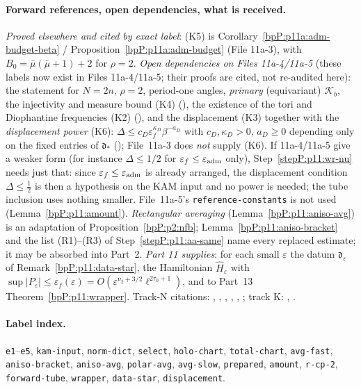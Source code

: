 \paragraph{Forward references, open dependencies, what is received.} \emph{Proved elsewhere and cited by exact label}: (K5) is Corollary~\ref{bpP:p11a:adm-budget-beta} / Proposition~\ref{bpP:p11a:adm-budget} (File 11a-3), with $B_0=\bar\mu(\bar\mu+1)+2$ for $\rho=2$. \emph{Open dependencies on Files 11a-4/11a-5} (these labels now exist in Files 11a-4/11a-5; their proofs are cited, not re-audited here): the statement  for $N=2n$, $\rho=2$, period-one angles, \emph{primary} (equivariant) $\mathcal K_b$, the injectivity and measure bound (K4) (), the existence of the tori and Diophantine frequencies (K2) (), and the displacement (K3) together with the \emph{displacement power} (K6): $\Delta\le c_D\varepsilon_f^{\kappa_D}\beta^{-a_D}$ with $c_D,\kappa_D>0$, $a_D\ge0$ depending only on the fixed entries of $\mathfrak d_*$ (); File~11a-3 does \emph{not} supply (K6). If 11a-4/11a-5 give a weaker form (for instance $\Delta\le1/2$ for $\varepsilon_f\le\varepsilon_{\rm adm}$ only), Step~\ref{stepP:p11:wr-nu} needs just that: since $\varepsilon_f\le\varepsilon_{\rm adm}$ is already arranged, the displacement condition $\Delta\le\frac12$ is then a hypothesis on the KAM input and no power is needed; the tube inclusion uses nothing smaller. File~11a-5's \texttt{reference-constants} is not used (Lemma~\ref{bpP:p11:amount}). \emph{Rectangular averaging} (Lemma~\ref{bpP:p11:aniso-avg}) is an adaptation of Proposition~\ref{bpP:p2:nfb}; Lemma~\ref{bpP:p11:aniso-bracket} and the list (R1)--(R3) of Step~\ref{stepP:p11:aa-same} name every replaced estimate; it may be absorbed into Part~2. \emph{Part 11 supplies}: for each small $\varepsilon$ the datum $\mathfrak d_\varepsilon$ of Remark~\ref{bpP:p11:data-star}, the Hamiltonian $\hat H_\varepsilon$ with $\sup\lvert P_\varepsilon\rvert\le\varepsilon_f(\varepsilon)=O(\varepsilon^{\nu_2+3/2}\ell^{2\tau_0+1})$, and to Part~13 Theorem~\ref{bpP:p11:wrapper}. Track-N citations: , , , , , ; track K: , .

\paragraph{Label index.} \texttt{e1}--\texttt{e5}, \texttt{kam-input}, \texttt{norm-dict}, \texttt{select}, \texttt{holo-chart}, \texttt{total-chart}, \texttt{avg-fast}, \texttt{aniso-bracket}, \texttt{aniso-avg}, \texttt{polar-avg}, \texttt{avg-slow}, \texttt{prepared}, \texttt{amount}, \texttt{r-cp-2}, \texttt{forward-tube}, \texttt{wrapper}, \texttt{data-star}, \texttt{displacement}.
\endgroup
